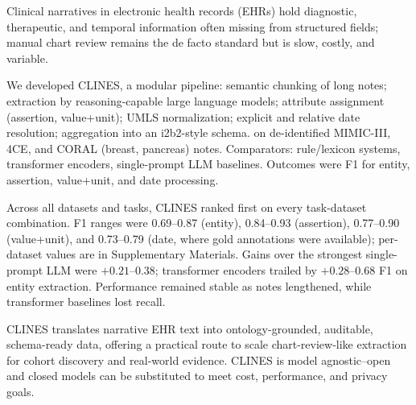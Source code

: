 \noindent{} Clinical narratives in electronic health records (EHRs) hold diagnostic, therapeutic, and temporal information often missing from structured fields; manual chart review remains the de facto standard but is slow, costly, and variable. 

\noindent{} We developed CLINES, a modular  pipeline: semantic chunking of long notes; extraction by reasoning-capable large language models; attribute assignment (assertion, value+unit); UMLS normalization; explicit and relative date resolution; aggregation into an i2b2-style schema.  on de-identified MIMIC-III, 4CE, and CORAL (breast, pancreas) notes. Comparators: rule/lexicon systems, transformer encoders, single-prompt LLM baselines. Outcomes were F1 for entity, assertion, value+unit, and date processing.

\noindent{} Across all datasets and tasks, CLINES ranked first on every task-dataset combination. F1 ranges were 0.69--0.87 (entity), 0.84--0.93 (assertion), 0.77--0.90 (value+unit), and 0.73--0.79 (date, where gold annotations were available); per-dataset values are in Supplementary Materials. Gains over the strongest single-prompt LLM were $+0.21$--$0.38$; transformer encoders trailed by $+0.28$--$0.68$ F1 on entity extraction. Performance remained stable as notes lengthened, while transformer baselines lost recall. 

\noindent{} CLINES translates narrative EHR text into ontology-grounded, auditable, schema-ready data, offering a practical route to scale chart-review-like extraction for cohort discovery and real-world evidence.  CLINES is model agnostic--open and closed models can be substituted to meet cost, performance, and privacy goals.
